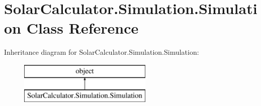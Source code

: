 \hypertarget{class_solar_calculator_1_1_simulation_1_1_simulation}{\section{Solar\-Calculator.\-Simulation.\-Simulation Class Reference}
\label{class_solar_calculator_1_1_simulation_1_1_simulation}
}
Inheritance diagram for Solar\-Calculator.\-Simulation.\-Simulation\-:\begin{figure}[H]
\begin{center}
\leavevmode
\includegraphics[height=2.000000cm]{class_solar_calculator_1_1_simulation_1_1_simulation}
\end{center}
\end{figure}
